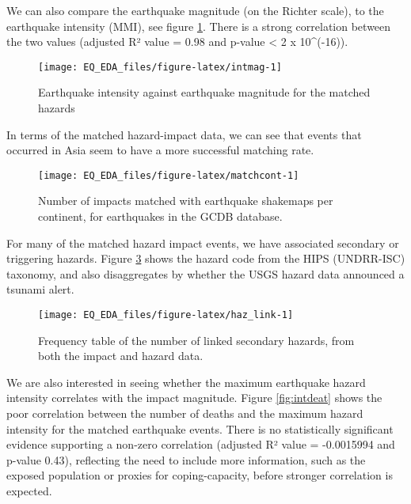 \documentclass[
]{article}
\begin{document}
We can also compare the earthquake magnitude (on the Richter scale), to the earthquake intensity (MMI), see figure \ref{fig:intmag}. There is a strong correlation between the two values (adjusted R² value = 0.98 and p-value \textless{} 2 x 10\^{}(-16)).

\begin{figure}
\texttt{[image: EQ\_EDA\_files/figure-latex/intmag-1]} \caption[Earthquake intensity against earthquake magnitude for the matched hazards]{Earthquake intensity against earthquake magnitude for the matched hazards}\label{fig:intmag}
\end{figure}

In terms of the matched hazard-impact data, we can see that events that occurred in Asia seem to have a more successful matching rate.

\begin{figure}
\texttt{[image: EQ\_EDA\_files/figure-latex/matchcont-1]} \caption[Number of impacts matched with earthquake shakemaps per continent, for earthquakes in the GCDB database]{Number of impacts matched with earthquake shakemaps per continent, for earthquakes in the GCDB database.}\label{fig:matchcont}
\end{figure}

For many of the matched hazard impact events, we have associated secondary or triggering hazards. Figure \ref{fig:haz_link} shows the hazard code from the HIPS (UNDRR-ISC) taxonomy, and also disaggregates by whether the USGS hazard data announced a tsunami alert.

\begin{figure}
\texttt{[image: EQ\_EDA\_files/figure-latex/haz\_link-1]} \caption[Frequency table of the number of linked secondary hazards, from both the impact and hazard data]{Frequency table of the number of linked secondary hazards, from both the impact and hazard data.}\label{fig:haz_link}
\end{figure}

We are also interested in seeing whether the maximum earthquake hazard intensity correlates with the impact magnitude. Figure \ref{fig:intdeat} shows the poor correlation between the number of deaths and the maximum hazard intensity for the matched earthquake events. There is no statistically significant evidence supporting a non-zero correlation (adjusted R² value = -0.0015994 and p-value 0.43), reflecting the need to include more information, such as the exposed population or proxies for coping-capacity, before stronger correlation is expected.
\end{document}

